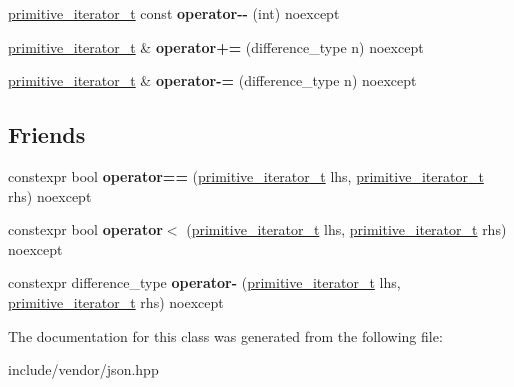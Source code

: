 \begin{DoxyCompactItemize}
\mbox{\hyperlink{classnlohmann_1_1detail_1_1primitive__iterator__t}{primitive\+\_\+iterator\+\_\+t}} const {\bfseries operator-\/-\/} (int) noexcept
\item 
\mbox{\label{classnlohmann_1_1detail_1_1primitive__iterator__t_aee01535df0b3b40137d9241029a9a203}} 
\mbox{\hyperlink{classnlohmann_1_1detail_1_1primitive__iterator__t}{primitive\+\_\+iterator\+\_\+t}} \& {\bfseries operator+=} (difference\+\_\+type n) noexcept
\item 
\mbox{\label{classnlohmann_1_1detail_1_1primitive__iterator__t_a0bf83ab08abe1ae4b51c790c85cdf151}} 
\mbox{\hyperlink{classnlohmann_1_1detail_1_1primitive__iterator__t}{primitive\+\_\+iterator\+\_\+t}} \& {\bfseries operator-\/=} (difference\+\_\+type n) noexcept
\end{DoxyCompactItemize}
\subsection*{Friends}
\begin{DoxyCompactItemize}
\item 
\mbox{\label{classnlohmann_1_1detail_1_1primitive__iterator__t_aae1e1e2ec0e229d1291d69de57d76bbe}} 
constexpr bool {\bfseries operator==} (\mbox{\hyperlink{classnlohmann_1_1detail_1_1primitive__iterator__t}{primitive\+\_\+iterator\+\_\+t}} lhs, \mbox{\hyperlink{classnlohmann_1_1detail_1_1primitive__iterator__t}{primitive\+\_\+iterator\+\_\+t}} rhs) noexcept
\item 
\mbox{\label{classnlohmann_1_1detail_1_1primitive__iterator__t_a901a95e6d73c9509d3dcde914f6c8a9d}} 
constexpr bool {\bfseries operator$<$} (\mbox{\hyperlink{classnlohmann_1_1detail_1_1primitive__iterator__t}{primitive\+\_\+iterator\+\_\+t}} lhs, \mbox{\hyperlink{classnlohmann_1_1detail_1_1primitive__iterator__t}{primitive\+\_\+iterator\+\_\+t}} rhs) noexcept
\item 
\mbox{\label{classnlohmann_1_1detail_1_1primitive__iterator__t_ac6d902d6ec9a02dabed5452d3ae78f7e}} 
constexpr difference\+\_\+type {\bfseries operator-\/} (\mbox{\hyperlink{classnlohmann_1_1detail_1_1primitive__iterator__t}{primitive\+\_\+iterator\+\_\+t}} lhs, \mbox{\hyperlink{classnlohmann_1_1detail_1_1primitive__iterator__t}{primitive\+\_\+iterator\+\_\+t}} rhs) noexcept
\end{DoxyCompactItemize}


The documentation for this class was generated from the following file\+:\begin{DoxyCompactItemize}
\item 
include/vendor/json.\+hpp\end{DoxyCompactItemize}
